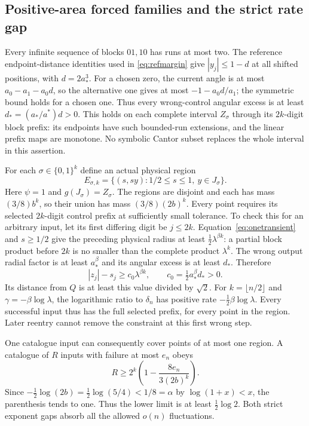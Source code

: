 \documentclass[11pt]{amsart}
\theoremstyle{definition}
\theoremstyle{remark}
\numberwithin{equation}{section}
\begin{document}
\subsection{Positive-area forced families and the strict rate gap}
Every infinite sequence of blocks $01,10$ has runs at most two.
The reference endpoint-distance identities used in
\eqref{eq:refmargin} give $|y_j|\le1-d$ at all shifted positions,
with $d=2a_*^3$. For a chosen zero, the current angle is at most
$a_0-a_1-a_0d$, so the alternative one gives at most
$-1-a_0d/a_1$; the symmetric bound holds for a chosen one.
Thus every wrong-control angular excess is at least
$d_*=(a_*/a^*)d>0$.
This holds on each complete interval $Z_\sigma$ through its
$2k$-digit block prefix: its endpoints have such bounded-run
extensions, and the linear prefix maps are monotone. No symbolic
Cantor subset replaces the whole interval in this assertion.

For each $\sigma\in\{0,1\}^k$ define an actual physical region
\[
E_{\sigma,k}=\{(s,sy):1/2\le s\le1,\ y\in J_\sigma\}.
\]
Here $\psi=1$ and $g(J_\sigma)=Z_\sigma$.
The regions are disjoint and each has mass
$(3/8)b^k$, so their union has mass $(3/8)(2b)^k$.
Every point requires its selected $2k$-digit control prefix at
sufficiently small tolerance. To check this for an arbitrary input,
let its first differing digit be $j\le2k$.
Equation~\eqref{eq:onetransient} and $s\ge1/2$ give the
preceding physical radius at least
$\tfrac12\lambda^{\beta k}$: a partial block product before
$2k$ is no smaller than the complete product $\lambda^k$.
The wrong output radial factor is at least $a_*^\beta$ and
its angular excess is at least $d_*$. Therefore
\begin{equation}\label{eq:cantorwrong}
|z_j|-s_j\ge c_0\lambda^{\beta k},
\qquad c_0=\tfrac12a_*^\beta d_*>0.
\end{equation}
Its distance from $Q$ is at least this value divided by $\sqrt2$.
For $k=\lfloor n/2\rfloor$ and
$\gamma=-\beta\log\lambda$, the logarithmic ratio to $\delta_n$
has positive rate $-\tfrac12\beta\log\lambda$.
Every successful input thus has the full selected prefix, for every
point in the region. Later reentry cannot remove the constraint
at this first wrong step.

One catalogue input can consequently cover points of at most one
region. A catalogue of $R$ inputs with failure at most $e_n$ obeys
\begin{equation}\label{eq:cantorcount}
R\ge2^k\left(1-\frac{8e_n}{3(2b)^k}\right).
\end{equation}
Since $-\tfrac12\log(2b)=\tfrac12\log(5/4)<1/8=\alpha$
by $\log(1+x)<x$, the parenthesis tends to one.
Thus the lower limit is at least $\tfrac12\log2$.
Both strict exponent gaps absorb all the allowed $o(n)$ fluctuations.
\end{document}
